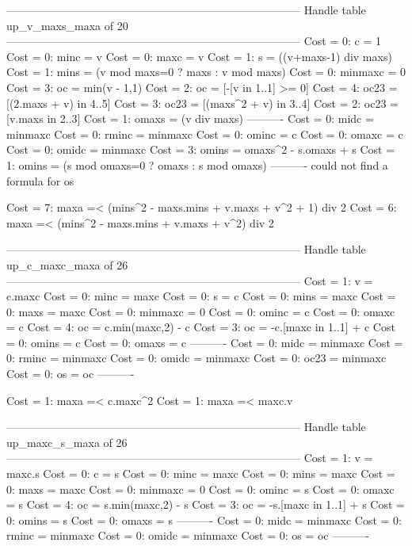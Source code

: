 --------------------------------------------------------------------------------
Handle table up_v_maxs_maxa of 20
--------------------------------------------------------------------------------
Cost =  0:  c       = 1
Cost =  0:  minc    = v
Cost =  0:  maxc    = v
Cost =  1:  s       = ((v+maxs-1) div maxs)
Cost =  1:  mins    = (v mod maxs=0 ? maxs : v mod maxs)
Cost =  0:  minmaxc = 0
Cost =  3:  oc      = min(v - 1,1)
Cost =  2:  oc      = [-[v in 1..1] >= 0]
Cost =  4:  oc23    = [(2.maxs + v) in 4..5]
Cost =  3:  oc23    = [(maxs^2 + v) in 3..4]
Cost =  2:  oc23    = [v.maxs in 2..3]
Cost =  1:  omaxs   = (v div maxs)
----------
Cost =  0:  midc    = minmaxc
Cost =  0:  rminc   = minmaxc
Cost =  0:  ominc   = c
Cost =  0:  omaxc   = c
Cost =  0:  omidc   = minmaxc
Cost =  3:  omins   = omaxs^2 - s.omaxs + s
Cost =  1:  omins   = (s mod omaxs=0 ? omaxs : s mod omaxs)
----------
could not find a formula for os

Cost =  7:  maxa =< (mins^2 - maxs.mins + v.maxs + v^2 + 1) div 2
Cost =  6:  maxa =< (mins^2 - maxs.mins + v.maxs + v^2) div 2

--------------------------------------------------------------------------------
Handle table up_c_maxc_maxa of 26
--------------------------------------------------------------------------------
Cost =  1:  v       = c.maxc
Cost =  0:  minc    = maxc
Cost =  0:  s       = c
Cost =  0:  mins    = maxc
Cost =  0:  maxs    = maxc
Cost =  0:  minmaxc = 0
Cost =  0:  ominc   = c
Cost =  0:  omaxc   = c
Cost =  4:  oc      = c.min(maxc,2) - c
Cost =  3:  oc      = -c.[maxc in 1..1] + c
Cost =  0:  omins   = c
Cost =  0:  omaxs   = c
----------
Cost =  0:  midc    = minmaxc
Cost =  0:  rminc   = minmaxc
Cost =  0:  omidc   = minmaxc
Cost =  0:  oc23    = minmaxc
Cost =  0:  os      = oc
----------

Cost =  1:  maxa =< c.maxc^2
Cost =  1:  maxa =< maxc.v

--------------------------------------------------------------------------------
Handle table up_maxc_s_maxa of 26
--------------------------------------------------------------------------------
Cost =  1:  v       = maxc.s
Cost =  0:  c       = s
Cost =  0:  minc    = maxc
Cost =  0:  mins    = maxc
Cost =  0:  maxs    = maxc
Cost =  0:  minmaxc = 0
Cost =  0:  ominc   = s
Cost =  0:  omaxc   = s
Cost =  4:  oc      = s.min(maxc,2) - s
Cost =  3:  oc      = -s.[maxc in 1..1] + s
Cost =  0:  omins   = s
Cost =  0:  omaxs   = s
----------
Cost =  0:  midc    = minmaxc
Cost =  0:  rminc   = minmaxc
Cost =  0:  omidc   = minmaxc
Cost =  0:  os      = oc
----------

